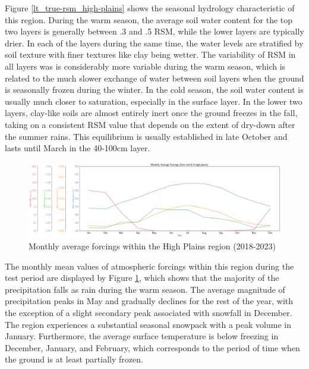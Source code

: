Figure \ref{lt_true-rsm_high-plains} shows the seasonal hydrology characteristic of this region. During the warm season, the average soil water content for the top two layers is generally between .3 and .5 RSM, while the lower layers are typically drier. In each of the layers during the same time, the water levels are stratified by soil texture with finer textures like clay being wetter. The variability of RSM in all layers was is considerably more variable during the warm season, which is related to the much slower exchange of water between soil layers when the ground is seasonally frozen during the winter. In the cold season, the soil water content is usually much closer to saturation, especially in the surface layer. In the lower two layers, clay-like soils are almost entirely inert once the ground freezes in the fall, taking on a consistent RSM value that depends on the extent of dry-down after the summer rains. This equilibrium is usually established in late October and lasts until March in the 40-100cm layer.

\begin{figure}[H]
    \centering

    \includegraphics[width=.98\linewidth,draft=false]{figures/lt-high-plains/eval-grid_lt-high-plains_lstm-rsm-9_pixelwise-time-stats_monthly-all-forcings.png}

    \caption{Monthly average forcings within the High Plains region (2018-2023)}
    \label{lt_monthly-forcings_high-plains}
\end{figure}

The monthly mean values of atmospheric forcings within this region during the test period are displayed by Figure \ref{lt_monthly-forcings_high-plains}, which shows that the majority of the precipitation falls as rain during the warm season. The average magnitude of precipitation peaks in May and gradually declines for the rest of the year, with the exception of a slight secondary peak associated with snowfall in December. The region experiences a substantial seasonal snowpack with a peak volume in January. Furthermore, the average surface temperature is below freezing in December, January, and February, which corresponds to the period of time when the ground is at least partially frozen.


